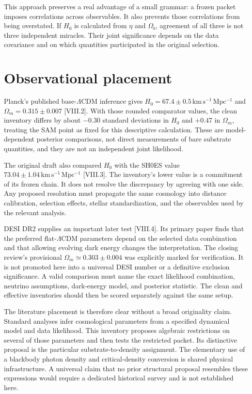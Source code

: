This approach preserves a real advantage of a small grammar: a frozen packet imposes correlations across observables. It also prevents those correlations from being overstated. If $H_0$ is calculated from $\eta$ and $\Omega_b$, agreement of all three is not three independent miracles. Their joint significance depends on the data covariance and on which quantities participated in the original selection.

\section{Observational placement}
Planck's published base-$\Lambda$CDM inference gives $H_0=67.4\pm0.5\,\mathrm{km\,s^{-1}\,Mpc^{-1}}$ and $\Omega_m=0.315\pm0.007$ [VIII.2]. With those rounded comparator values, the clean inventory differs by about $-0.30$ standard deviations in $H_0$ and $+0.47$ in $\Omega_m$, treating the SAM point as fixed for this descriptive calculation. These are model-dependent posterior comparisons, not direct measurements of bare substrate quantities, and they are not an independent joint likelihood.

The original draft also compared $H_0$ with the SH0ES value $73.04\pm1.04\,\mathrm{km\,s^{-1}\,Mpc^{-1}}$ [VIII.3]. The inventory's lower value is a commitment of its frozen chain. It does not resolve the discrepancy by agreeing with one side. Any proposed resolution must propagate the same cosmology into distance calibration, selection effects, stellar standardization, and the observables used by the relevant analysis.

DESI DR2 supplies an important later test [VIII.4]. Its primary paper finds that the preferred flat-$\Lambda$CDM parameters depend on the selected data combination and that allowing evolving dark energy changes the interpretation. The closing review's provisional $\Omega_m\simeq0.303\pm0.004$ was explicitly marked for verification. It is not promoted here into a universal DESI number or a definitive exclusion significance. A valid comparison must name the exact likelihood combination, neutrino assumptions, dark-energy model, and posterior statistic. The clean and effective inventories should then be scored separately against the same setup.

The literature placement is therefore clear without a broad originality claim. Standard analyses infer cosmological parameters from a specified dynamical model and data likelihood. This inventory proposes algebraic restrictions on several of those parameters and then tests the restricted packet. Its distinctive proposal is the particular substrate-to-density assignment. The elementary use of a blackbody photon density and critical-density conversion is shared physical infrastructure. A universal claim that no prior structural proposal resembles these expressions would require a dedicated historical survey and is not established here.

